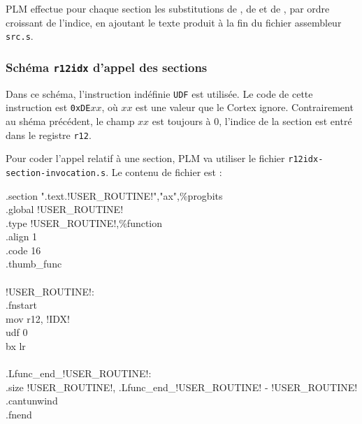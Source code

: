 PLM effectue pour chaque section les substitutions de , de  et de , par ordre croissant de l'indice, en ajoutant le texte produit à la fin du fichier assembleur \texttt{src.s}.










\subsubsection{Schéma \texttt{r12idx} d'appel des sections}

Dans ce schéma, l'instruction indéfinie \texttt{UDF} est utilisée.  Le code de cette instruction est \texttt{0xDE$xx$}, où $xx$ est une valeur que le Cortex ignore. Contrairement au shéma précédent, le champ $xx$ est toujours à $0$, l'indice de la section est entré dans le registre \texttt{r12}.

Pour coder l'appel relatif à une section, PLM va utiliser le fichier \texttt{r12idx-section-invocation.s}. Le contenu de fichier est :
\begin{SHELL}\small
\hspace*{1.2em}.section  ".text.!USER\_ROUTINE!","ax",\%progbits\\
\hspace*{1.2em}.global !USER\_ROUTINE!\\
\hspace*{1.2em}.type  !USER\_ROUTINE!,\%function\\
\hspace*{1.2em}.align  1\\
\hspace*{1.2em}.code  16\\
\hspace*{1.2em}.thumb\_func\\
\\
!USER\_ROUTINE!:\\
\hspace*{1.2em}.fnstart\\
\hspace*{1.2em}mov r12, !IDX!\\
\hspace*{1.2em}udf 0\\
\hspace*{1.2em}bx  lr\\
\\
.Lfunc\_end\_!USER\_ROUTINE!:\\
\hspace*{1.2em}.size  !USER\_ROUTINE!, .Lfunc\_end\_!USER\_ROUTINE! - !USER\_ROUTINE!\\
\hspace*{1.2em}.cantunwind\\
\hspace*{1.2em}.fnend
\end{SHELL}

